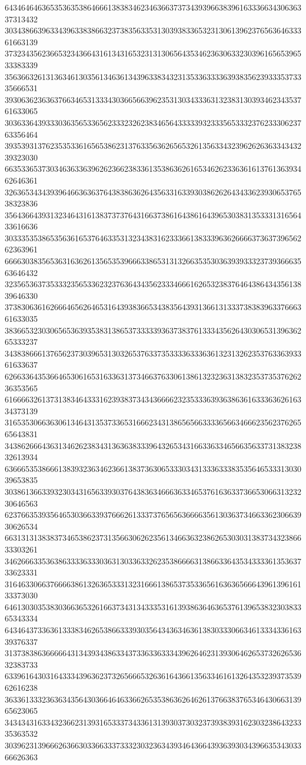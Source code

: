 64346464636535363538646661383834623463663737343939663839616333663430636337313432
30343866396334396338386632373835633531303938336532313061396237656364633361663139
37323435623665323436643161343165323131306564353462363063323039616565396533383339
35636632613136346130356134636134396338343231353363333639383562393335373335666531
39306362363637663465313334303665663962353130343336313238313039346234353761633065
30363364393330363565336562333232623834656433333932333565333237623330623763356464
39353931376235353361656538623137633563626565326135633432396262636334343239323030
66353365373034636336396262366238336135386362616534626233636161376136393462646361
32636534343939646636363764383863626435633163393038626264343362393065376538323836
35643664393132346431613837373764316637386164386164396530383135333131656433616636
30333535386535636165376463353132343831623336613833396362666637363739656262363961
66663038356536316362613565353966633865313132663535303639393332373936663563646432
32356536373533323565336232376364343562333466616265323837646438643435613839646330
37383063616266646562646531643938366534383564393136613133373838396337666361633035
38366532303065653639353831386537333339363738376133343562643030653139636265333237
34383866613765623730396531303265376337353333633363613231326235376336393361633637
62663364353664653061653163363137346637633061386132323631383235373537626236353565
61666632613731383464333162393837343436666232353336393638636163336362616334373139
31653530663630613464313537336531666234313865656633336566346662356237626565643831
34386266643631346262383431363638333964326534316633633465663563373138323832613934
63666535386661383932363462366138373630653330343133363338353564653331303039653835
30386136633932303431656339303764383634666363346537616363373665306631323230646563
62376635393564653036633937666261333737656563666635613036373466336230663930626534
66313131383837346538623731356630626235613466363238626530303138373432386633303261
34626663353638633336333036313033633262353866663138663364353433336135363733623331
31646330663766663861326365333132316661386537353365616363656664396139616133373030
64613030353830366365326166373431343335316139386364636537613965383230383365343334
64346437336361333834626538663339303564343634636138303330663461333433616339376337
31373838636666643134393438633437336336333439626462313930646265373262653632383733
63396164303164333439636237326566653263616436613563346161326435323937353962616238
36336133323636343564303664646336626535386362646261376638376534643066313965623065
34343431633432366231393165333734336131393037303237393839316230323864323335363532
30396231396662636630336633373332303236343934643664393639303439663534303366626363
